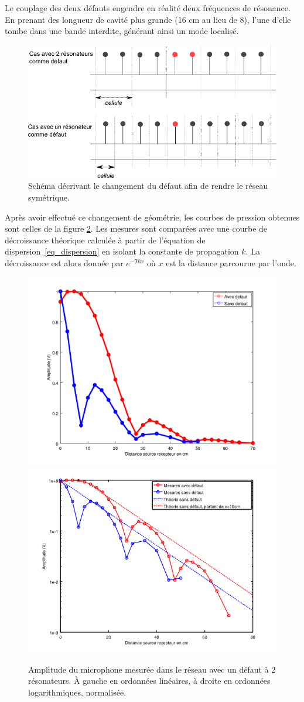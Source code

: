 Le couplage des deux défauts engendre en réalité deux fréquences de résonance. En prenant des longueur de cavité plus grande (16 cm au lieu de 8), l'une d'elle tombe dans une bande interdite, générant ainsi un mode localisé.

\begin{figure}[!h]
\centering
\includegraphics[scale=0.5]{./images_chp3/chgmt_defaut.png}
\caption{\label{fig_exp} Schéma décrivant le changement du défaut afin de rendre le réseau symétrique.}
\end{figure}



Après avoir effectué ce changement de géométrie, les courbes de pression obtenues sont celles de la figure \ref{p_tube2}.
Les mesures sont comparées avec une courbe de décroissance théorique calculée à partir de l'équation de dispersion~\ref{eq_dispersion} en isolant la constante de propagation $k$. La décroissance est alors donnée par $e^{-\Im{k}x}$ où $x$ est la distance parcourue par l'onde.

\begin{figure}[!h]
\centering
\includegraphics[width=0.5 \textwidth]{./images_chp3/comparaison_decroissance_lin_theo.png}\hfill
\includegraphics[width=0.5 \textwidth]{./images_chp3/comparaison_decroissance_log_theo.png}
\caption{\label{p_tube2} Amplitude du microphone mesurée dans le réseau avec un défaut à 2 résonateurs. À gauche en ordonnées linéaires, à droite en ordonnées logarithmiques, normalisée.}
\end{figure}

